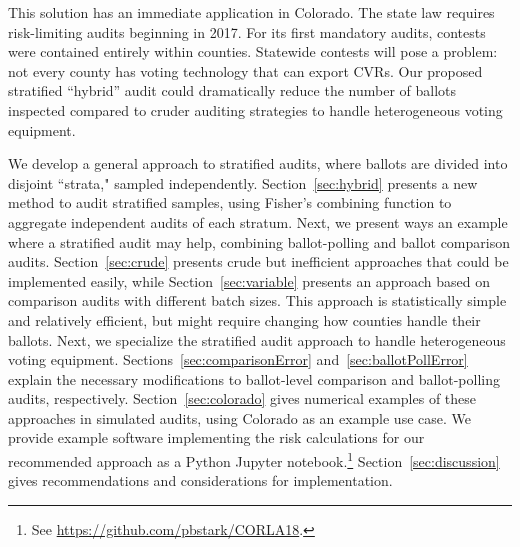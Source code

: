 \documentclass[runningheads]{llncs}
\begin{document}
This solution has an immediate application in Colorado.
The state law requires risk-limiting audits beginning in 2017.
For its first mandatory audits, contests were contained entirely within counties.
Statewide contests will pose a problem:
not every county has voting technology that can export CVRs.
Our proposed stratified ``hybrid'' audit could dramatically reduce the number of ballots inspected
compared to cruder auditing strategies to handle heterogeneous voting equipment.

We develop a general approach to stratified audits, where ballots are divided into disjoint ``strata,"
sampled independently.
Section~\ref{sec:hybrid} presents a new method to audit stratified samples, 
using Fisher's combining function to aggregate independent audits of each stratum. 
Next, we present ways an example where a stratified audit may help, combining ballot-polling and ballot comparison audits.
Section~\ref{sec:crude} presents crude but inefficient approaches that could be implemented easily, while
Section~\ref{sec:variable} presents an approach based on comparison audits with different batch sizes.
This approach is statistically simple and relatively efficient, but might require changing how counties
handle their ballots.
Next, we specialize the stratified audit approach to handle heterogeneous voting equipment.
Sections~\ref{sec:comparisonError} and~\ref{sec:ballotPollError} explain
the necessary modifications to ballot-level comparison and ballot-polling audits, respectively. 
Section~\ref{sec:colorado} gives numerical examples of these approaches in simulated audits,
using Colorado as an example use case.
We provide example software implementing the risk calculations for
our recommended approach as a Python Jupyter notebook.\footnote{%
 See \url{https://github.com/pbstark/CORLA18}.
}
Section~\ref{sec:discussion} gives recommendations and
considerations for implementation.
\end{document}
